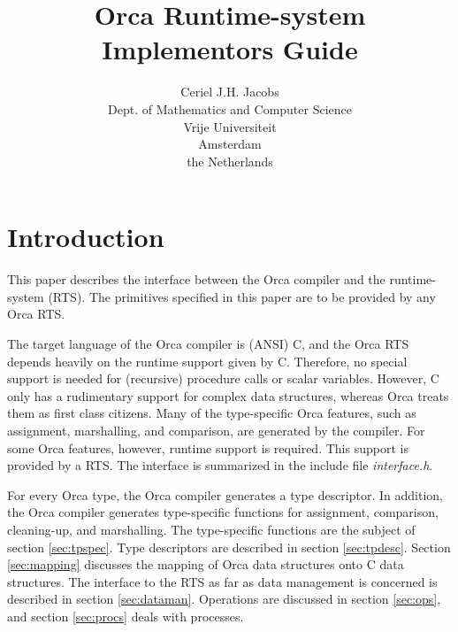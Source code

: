 \documentclass[10pt]{article}
\begin{document}
\title{Orca Runtime-system Implementors Guide}
\author{
Ceriel J.H. Jacobs \\
Dept. of Mathematics and Computer Science \\
Vrije Universiteit \\
Amsterdam \\
the Netherlands}

\maketitle

\section{Introduction}\label{sec:intro}
This paper describes the interface between the Orca compiler and the
runtime-system (RTS).
The primitives specified in this paper are to be provided by any Orca
RTS.

The target language of the Orca compiler is (ANSI) C, 
and the Orca RTS depends heavily on the runtime support given by C.
Therefore, no special support is needed for (recursive) procedure calls
or scalar variables.
However, C only has a rudimentary support for complex data structures, 
whereas Orca treats them as first class citizens.
Many of the type-specific Orca features, such as assignment, marshalling,
and comparison, are generated by the compiler.
For some Orca features, however, runtime support is required.
This support is provided by a RTS.
The interface is summarized in
the include file {\em interface.h}.

For every Orca type, the Orca compiler generates
a type descriptor.
In addition, the Orca compiler generates type-specific functions for
assignment, comparison, cleaning-up, and marshalling.
The type-specific functions are the subject of section \ref{sec:tpspec}.
Type descriptors are described in section \ref{sec:tpdesc}.
Section \ref{sec:mapping} discusses the mapping of Orca data structures onto C
data structures.
The interface to the RTS as far as data management is concerned is
described in section \ref{sec:dataman}.
Operations are discussed in section \ref{sec:ops}, and section \ref{sec:procs} deals with processes.
\end{document}
